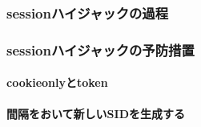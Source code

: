 
\subsubsection{sessionハイジャックの過程}

\subsubsection{sessionハイジャックの予防措置}
\paragraph{cookieonlyとtoken}

\paragraph{間隔をおいて新しいSIDを生成する}

